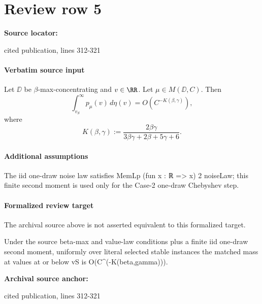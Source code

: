\documentclass[10pt]{article}
\begin{document}
\section*{Review row 5}
\textbf{Source locator:} {\footnotesize\raggedright cited publication, lines 312-\allowbreak{}321\par}
\paragraph{Verbatim source input}
\begin{ReviewVerbatim}
\begin{proposition}\label{thm1v2}
    Let $\DD$ be $\beta$-max-concentrating and $v\in \RR$. Let $\mu \in M(\DD, C)$. Then
    \begin{equation}
        \int_{v_S}^\infty p_\mu(v)\,d\eta(v) = O\left(C^{-K(\beta,\gamma)}\right),
    \end{equation}
    where
    \begin{equation}
        K(\beta,\gamma) := \frac{2\beta\gamma}{3\beta\gamma + 2\beta + 5\gamma + 6}.
    \end{equation}
\end{proposition}
\end{ReviewVerbatim}

\paragraph{Additional assumptions}
\begin{sloppypar}
The iid one-draw noise law satisfies MemLp (fun x : ℝ => x) 2 noiseLaw; this finite second moment is used only for the Case-2 one-draw Chebyshev step.
\end{sloppypar}
\paragraph{Formalized review target}
The archival source above is not asserted equivalent to this formalized target.
\begin{ReviewVerbatim}
Under the source beta-max and value-law conditions plus a finite iid one-draw second moment, uniformly over literal selected stable instances the matched mass at values at or below vS is O(C^(-K(beta,gamma))).
\end{ReviewVerbatim}

\textbf{Archival source anchor:} {\footnotesize\raggedright cited publication, lines 312-\allowbreak{}321\par}
\end{document}
